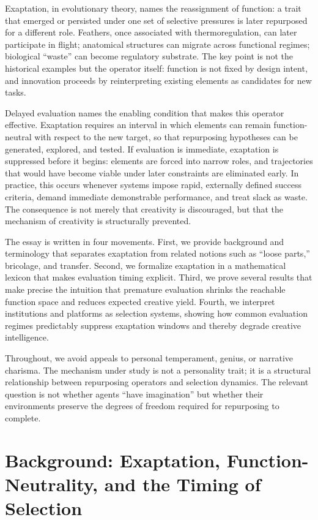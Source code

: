 \documentclass[11pt]{article}
\theoremstyle{definition}
\begin{document}
Exaptation, in evolutionary theory, names the reassignment of function: a trait that emerged or persisted under one set of selective pressures is later repurposed for a different role. Feathers, once associated with thermoregulation, can later participate in flight; anatomical structures can migrate across functional regimes; biological ``waste'' can become regulatory substrate. The key point is not the historical examples but the operator itself: function is not fixed by design intent, and innovation proceeds by reinterpreting existing elements as candidates for new tasks.

Delayed evaluation names the enabling condition that makes this operator effective. Exaptation requires an interval in which elements can remain function-neutral with respect to the new target, so that repurposing hypotheses can be generated, explored, and tested. If evaluation is immediate, exaptation is suppressed before it begins: elements are forced into narrow roles, and trajectories that would have become viable under later constraints are eliminated early. In practice, this occurs whenever systems impose rapid, externally defined success criteria, demand immediate demonstrable performance, and treat slack as waste. The consequence is not merely that creativity is discouraged, but that the mechanism of creativity is structurally prevented.

The essay is written in four movements. First, we provide background and terminology that separates exaptation from related notions such as ``loose parts,'' bricolage, and transfer. Second, we formalize exaptation in a mathematical lexicon that makes evaluation timing explicit. Third, we prove several results that make precise the intuition that premature evaluation shrinks the reachable function space and reduces expected creative yield. Fourth, we interpret institutions and platforms as selection systems, showing how common evaluation regimes predictably suppress exaptation windows and thereby degrade creative intelligence.

Throughout, we avoid appeals to personal temperament, genius, or narrative charisma. The mechanism under study is not a personality trait; it is a structural relationship between repurposing operators and selection dynamics. The relevant question is not whether agents ``have imagination'' but whether their environments preserve the degrees of freedom required for repurposing to complete.

\section{Background: Exaptation, Function-Neutrality, and the Timing of Selection}
\end{document}
